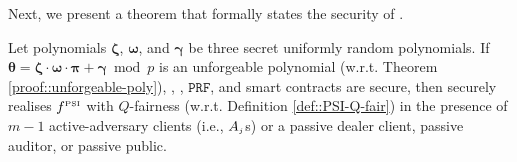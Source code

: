  
 
 Next, we present a theorem that formally states the security of \fpsi. 
 
 \begin{theorem}\label{theorem::F-PSI-security}
Let polynomials $\bm\zeta$, $\bm\omega$, and $\bm\gamma$ be three secret uniformly random polynomials. If  $\bm\theta=\bm\zeta\cdot \bm\omega\cdot\bm \pi+\bm \gamma \bmod p$ is an unforgeable polynomial (w.r.t. Theorem \ref{proof::unforgeable-poly}), \zspaa, \vopr,  $\mathtt{PRF}$, and smart contracts are secure, then \fpsi securely realises  $f^{\scriptscriptstyle \text{PSI}}$ with $Q$-fairness (w.r.t. Definition \ref{def::PSI-Q-fair}) in the presence of $m-1$  active-adversary clients (i.e., $A_{\scriptscriptstyle j}$s) or a passive dealer client, passive auditor, or passive public. 
 \end{theorem}
 






 
 
 